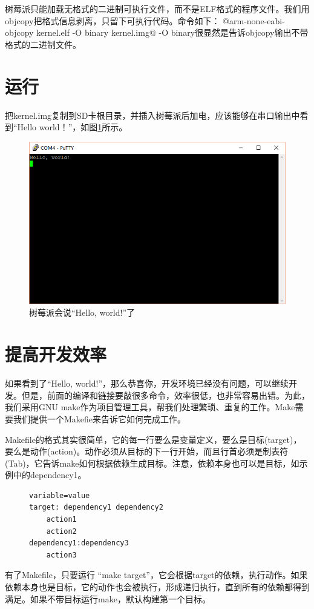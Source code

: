 \documentclass[main.tex]{subfiles}
\begin{document}
\begin{CJK*}{UTF8}{song}
树莓派只能加载无格式的二进制可执行文件，而不是ELF格式的程序文件。我们用objcopy把格式信息剥离，只留下可执行代码。命令如下：
@arm-none-eabi-objcopy kernel.elf -O binary kernel.img@
\noindent
-O binary很显然是告诉objcopy输出不带格式的二进制文件。
\section{运行}
把kernel.img复制到SD卡根目录，并插入树莓派后加电，应该能够在串口输出中看到“Hello world！”，如图\ref{figure:2-2}所示。

\begin{figure}[htp]
\centering
\includegraphics[scale=0.6]{figures/2-2.png}
\caption{树莓派会说“Hello, world!”了}
\label{figure:2-2}
\end{figure}

\section{提高开发效率}
\justify
如果看到了“Hello, world!”，那么恭喜你，开发环境已经没有问题，可以继续开发。但是，前面的编译和链接要敲很多命令，效率很低，也非常容易出错。为此，我们采用GNU make作为项目管理工具，帮我们处理繁琐、重复的工作。Make需要我们提供一个Makefie来告诉它如何完成工作。

\par
Makefile的格式其实很简单，它的每一行要么是变量定义，要么是目标(target)，要么是动作(action)。动作必须从目标的下一行开始，而且行首必须是制表符(Tab)，它告诉make如何根据依赖生成目标。注意，依赖本身也可以是目标，如示例中的dependency1。
\begin{figure}[htp]
\centering
\begin{minipage}{0.4\textwidth}
\begin{verbatim}
variable=value
target: dependency1 dependency2
    action1
    action2
dependency1:dependency3
    action3
\end{verbatim}
\end{minipage}
\end{figure}
\par
有了Makefile，只要运行 “make target”，它会根据target的依赖，执行动作。如果依赖本身也是目标，它的动作也会被执行，形成递归执行，直到所有的依赖都得到满足。如果不带目标运行make，默认构建第一个目标。


\end{CJK*}
\end{document}
